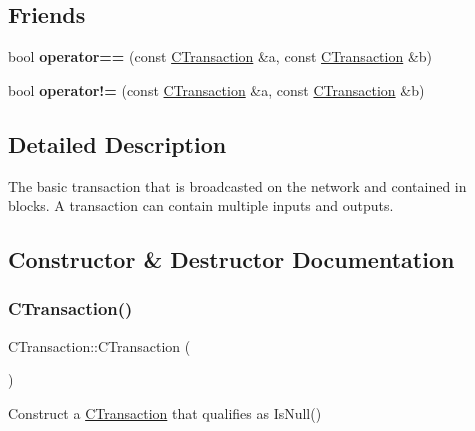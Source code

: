 \subsection*{Friends}
\begin{DoxyCompactItemize}
\item 
\mbox{\label{class_c_transaction_a1afe3b8f0f0daca6f653756ee44c9e44}} 
bool {\bfseries operator==} (const \mbox{\hyperlink{class_c_transaction}{C\+Transaction}} \&a, const \mbox{\hyperlink{class_c_transaction}{C\+Transaction}} \&b)
\item 
\mbox{\label{class_c_transaction_ab7c00027d7a2622792736f6a3a579d5d}} 
bool {\bfseries operator!=} (const \mbox{\hyperlink{class_c_transaction}{C\+Transaction}} \&a, const \mbox{\hyperlink{class_c_transaction}{C\+Transaction}} \&b)
\end{DoxyCompactItemize}


\subsection{Detailed Description}
The basic transaction that is broadcasted on the network and contained in blocks. A transaction can contain multiple inputs and outputs. 

\subsection{Constructor \& Destructor Documentation}
\mbox{\label{class_c_transaction_a41717180530fca69eb0163c1024ae286}} 
\subsubsection{\texorpdfstring{CTransaction()}{CTransaction()}\hspace{0.1cm}{\footnotesize\ttfamily [1/2]}}
{\footnotesize\ttfamily C\+Transaction\+::\+C\+Transaction (\begin{DoxyParamCaption}{ }\end{DoxyParamCaption})}

Construct a \mbox{\hyperlink{class_c_transaction}{C\+Transaction}} that qualifies as Is\+Null() \mbox{\label{class_c_transaction_a6607e95af3e2851ee3b7fe335a05eb4c}} 
